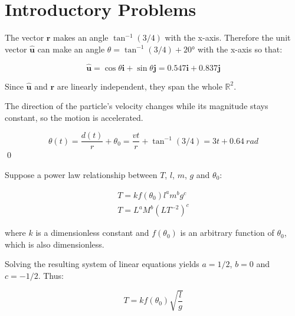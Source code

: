 \documentclass[12pt]{article}
\begin{document}



\pagebreak
\section*{Introductory Problems}



The vector $\mathbf{r}$ makes an angle $\tan^{-1}{(3/4)}$ with the x-axis. Therefore the unit vector $\hat{\mathbf{u}}$ can make an angle $\theta = \tan^{-1}{(3/4)} + \ang{20}$ with the x-axis so that:

\begin{equation}
    \hat{\mathbf{u}} = \cos{\theta} \mathbf{i} + \sin{\theta} \mathbf{j} = 0.547 \mathbf{i} + 0.837 \mathbf{j}
\end{equation}

Since $\hat{\mathbf{u}}$ and $\mathbf{r}$ are linearly independent, they span the whole $\mathbb{R}^{2}$.

The direction of the particle's velocity changes while its magnitude stays constant, so the motion is accelerated.


\begin{equation}
    \theta(t) = \frac{d(t)}{r} + \theta_{0} = \frac{vt}{r} + \tan^{-1}{(3/4)} = 3t + \qty{0.64}{rad}
\end{equation}
\qed



Suppose a power law relationship between $T$, $l$, $m$, $g$ and $\theta_{0}$:

\begin{equation}
\begin{split}
    T = k f(\theta_{0}) l^{a} m^{b} g^{c} \\
    T = L^{a} M^{b} (L T^{-2})^{c}
\end{split}
\end{equation}

where $k$ is a dimensionless constant and $f(\theta_{0})$ is an arbitrary function of $\theta_{0}$, which is also dimensionless.

Solving the resulting system of linear equations yields $a = 1/2$, $b = 0$ and $c = -1/2$. Thus:

\begin{equation}
    T = k f(\theta_{0}) \sqrt{\frac{l}{g}}
\end{equation}
\end{document}
